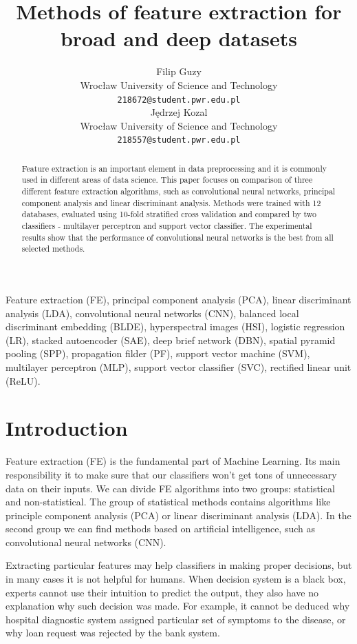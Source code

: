 \documentclass[a4paper, 10 pt, journal]{ieeeconf}
\title{\LARGE \bf
Methods of feature extraction for broad and deep datasets
}
\author{ \parbox{2 in}{\centering Filip Guzy \\
        Wrocław University of Science and Technology\\
        {\tt\small 218672@student.pwr.edu.pl}}
        \hspace*{ 0.3 in}
        \parbox{2 in}{\centering Jędrzej Kozal \\
        Wrocław University of Science and Technology\\
        {\tt\small 218557@student.pwr.edu.pl}}
}
\begin{document}
\maketitle
\thispagestyle{empty}
\pagestyle{empty}

\begin{abstract}
Feature extraction is an important element in data preprocessing and it is commonly used in different areas of data science. This paper focuses on comparison of three different feature extraction algorithms, such as convolutional neural networks, principal component analysis and linear discriminant analysis. Methods were trained with 12 databases, evaluated using 10-fold stratified cross validation and compared by two classifiers - multilayer perceptron and support vector classifier. The experimental results show that the performance of convolutional neural networks is the best from all selected methods.
\end{abstract}

\begin{keywords}
Feature extraction (FE), principal component analysis (PCA), linear discriminant analysis (LDA), convolutional neural networks (CNN), balanced local discriminant embedding (BLDE), hyperspectral images (HSI), logistic regression (LR), stacked autoencoder (SAE), deep brief network (DBN), spatial pyramid pooling (SPP), propagation filder (PF), support vector machine (SVM), multilayer perceptron (MLP), support vector classifier (SVC), rectified linear unit (ReLU).
\end{keywords}

\section{Introduction}

Feature extraction (FE) is the fundamental part of Machine Learning. Its main responsibility it to make sure that our classifiers won't get tons of unnecessary data on their inputs. We can divide FE algorithms into two groups: statistical and non-statistical. The group of statistical methods contains algorithms like principle component analysis (PCA) or linear discriminant analysis (LDA). In the second group we can find methods based on artificial intelligence, such as convolutional neural networks (CNN). 

Extracting particular features may help classifiers in making proper decisions, but in many cases it is not helpful for humans. When decision system is a black box, experts cannot use their intuition to predict the output, they also have no explanation why such decision was made. For example, it cannot be deduced why hospital diagnostic system assigned particular set of symptoms to the disease, or why loan request was rejected by the bank system.
\end{document}
